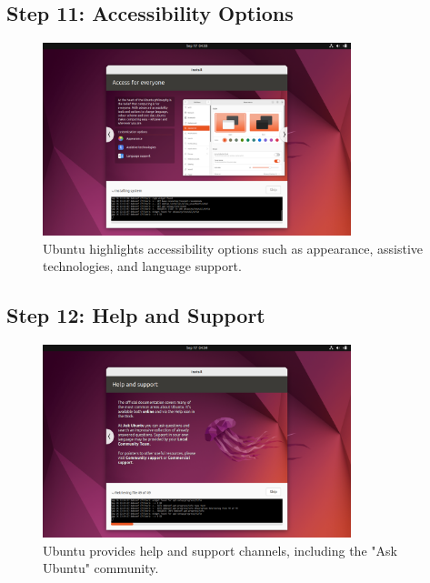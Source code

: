 \documentclass{article}
\begin{document}
\subsection{Step 11: Accessibility Options}
\begin{figure}[H]
    \centering
    \includegraphics[width=0.8\textwidth]{2024-09-17_04-33-27.png}
    \caption{Ubuntu highlights accessibility options such as appearance, assistive technologies, and language support.}
\end{figure}

\subsection{Step 12: Help and Support}
\begin{figure}[H]
    \centering
    \includegraphics[width=0.8\textwidth]{2024-09-17_04-34-49.png}
    \caption{Ubuntu provides help and support channels, including the "Ask Ubuntu" community.}
\end{figure}
\end{document}
